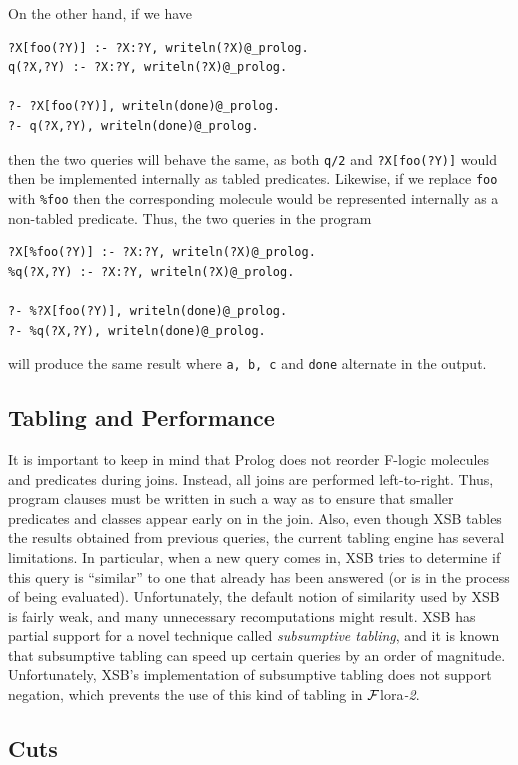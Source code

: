 \documentclass[11pt]{article}
\newcommand{\FLORA}{{\mbox{\sc ${\cal F}${lora}\rm\emph{-2}}}\xspace}
\newcommand{\fl}{\mbox{F-logic}\xspace}
\begin{document}
On the other hand, if we have
\begin{verbatim}
?X[foo(?Y)] :- ?X:?Y, writeln(?X)@_prolog.
q(?X,?Y) :- ?X:?Y, writeln(?X)@_prolog.

?- ?X[foo(?Y)], writeln(done)@_prolog.
?- q(?X,?Y), writeln(done)@_prolog.
\end{verbatim}
then the two queries will behave the same, as both {\tt q/2} and
\verb|?X[foo(?Y)]| would then be implemented internally as tabled predicates.
Likewise, if we replace {\tt foo} with {\tt \%foo} then the corresponding
molecule would be represented internally as a non-tabled predicate.
Thus, the two queries in the program
\begin{verbatim}
?X[%foo(?Y)] :- ?X:?Y, writeln(?X)@_prolog.
%q(?X,?Y) :- ?X:?Y, writeln(?X)@_prolog.

?- %?X[foo(?Y)], writeln(done)@_prolog.
?- %q(?X,?Y), writeln(done)@_prolog.
\end{verbatim}
will produce the same result where {\tt a, b, c} and {\tt done}
alternate in the output.

\subsection{Tabling and Performance}

It is important to keep in mind that Prolog does not reorder \fl molecules
and predicates during joins. Instead, all joins are performed
left-to-right.  Thus, program clauses must be written in such a way as to
ensure that smaller predicates and classes appear early on in the join.
Also, even though XSB tables the results obtained from previous queries,
the current tabling engine has several limitations. In particular, when a
new query comes in, XSB tries to determine if this query is ``similar'' to
one that already has been answered (or is in the process of being
evaluated).  Unfortunately, the default notion of similarity used by XSB is
fairly weak, and many unnecessary recomputations might result. XSB has
partial support for a
novel technique called \emph{subsumptive tabling}, and
it is known that subsumptive tabling can speed up
certain queries by an order of magnitude. Unfortunately, XSB's implementation
of subsumptive tabling does not support negation, which prevents
the use of this kind of tabling in \FLORA.


\subsection{Cuts}
\end{document}
